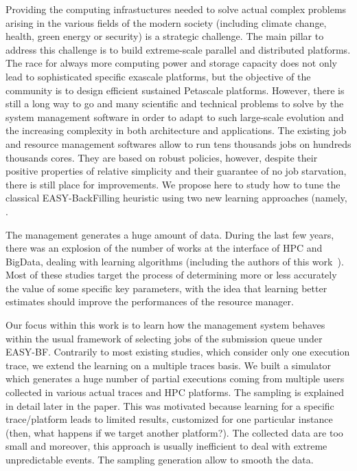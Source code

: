 \documentclass[sigconf]{acmart}
\begin{document}
Providing the computing infrastuctures needed to solve actual complex 
problems arising in the various fields of the modern society (including 
climate change, health, green energy or security) is a strategic challenge.
The main pillar to address this challenge is to build extreme-scale 
parallel and distributed platforms.
The race for always more computing power and storage capacity does not 
only lead to sophisticated specific exascale platforms, but the 
objective of the community is to design efficient sustained Petascale 
platforms.
However, there is still a long way to go and many scientific and 
technical problems to solve by the system management software in order 
to adapt to such large-scale evolution and the increasing complexity
in both architecture and applications.
The existing job and resource management softwares allow to run tens 
thousands jobs on hundreds thousands cores.
They are based on robust policies, however, despite their positive 
properties of relative simplicity and their guarantee of no job starvation,
there is still place for improvements.
We propose here to study how to tune the classical EASY-BackFilling 
heuristic using two new learning approaches (namely, .

\bigskip
The management generates a huge amount of data.
During the last few years, there was an explosion of the number of works 
at the interface of HPC and BigData, dealing with learning algorithms
(including the authors of this work~\cite{SC2015}).
Most of these studies target the process of determining more or less 
accurately the value of some specific key parameters, with the idea that
learning better estimates should improve the performances of the 
resource manager.

\bigskip
Our focus within this work is to learn how the management system behaves 
within the usual framework of selecting jobs of the submission queue 
under EASY-BF.
Contrarily to most existing studies, which consider only one execution 
trace, we extend the learning on a multiple traces basis.
We built a simulator which generates a huge number of partial executions 
coming from multiple users collected in various actual traces and HPC 
platforms.
The sampling is explained in detail later in the paper.
This was motivated because learning for a specific trace/platform leads 
to limited results, customized for one particular instance (then, what 
happens if we target another platform?).
The collected data are too small and moreover, this approach is usually 
inefficient to deal with extreme unpredictable events.
The sampling generation allow to smooth the data.
\end{document}
